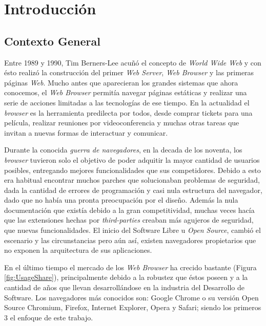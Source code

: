 


\chapter{Introducción}
\label{chap1:intro}


\section{Contexto General}
\label{chap1:CG}

Entre 1989 y 1990, Tim Berners-Lee acuñó el concepto de \textit{World Wide Web} y con ésto realizó la construcción del primer \textit{Web Server}, \textit{Web Browser} y las primeras páginas \textit{Web}. Mucho antes que aparecieran los grandes sistemas que ahora conocemos, el \textit{Web Browser} permitía navegar páginas estáticas y realizar una serie de acciones limitadas a las tecnologías de ese tiempo. En la actualidad el \textit{browser} es la herramienta predilecta por todos, desde comprar tickets para una película, realizar reuniones por videoconferencia y muchas otras tareas que invitan a nuevas formas de interactuar y comunicar.

Durante la conocida \textit{guerra de navegadores}, en la decada de los noventa, los \textit{browser} tuvieron solo el objetivo de poder adquitir la mayor cantidad de usuarios posibles, entregando mejores funcionalidades que sus competidores. Debido a esto era habitual encontrar muchos parches que solucionaban problemas de seguridad, dada la cantidad de errores de programación y casi nula estructura del navegador, dado que no había una pronta preocupación por el diseño. Además la nula documentación que existía debido a la gran competitividad, muchas veces hacía que las extensiones hechas por \textit{third-parties} creaban más agujeros de seguridad, que nuevas funcionalidades. El inicio del Software Libre u \textit{Open Source}, cambió el escenario y las circunstancias pero aún así, existen navegadores propietarios que no exponen la arquitectura de sus aplicaciones.

En el último tiempo el mercado de los \textit{Web Browser} ha crecido bastante (Figura \ref{fig:UsageShare}), principalmente debido a la robustez que éstos poseen y a la cantidad de años que llevan desarrollándose en la industria del Desarrollo de Software. Los navegadores más conocidos son: Google Chrome o su versión Open Source Chromium, Firefox, Internet Explorer, Opera y Safari; siendo los primeros 3 el enfoque de este trabajo.

